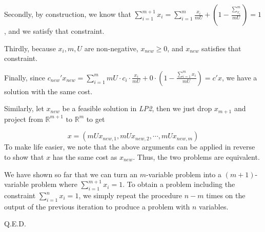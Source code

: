Secondly, by construction, we know that $\sum_{i=1}^{m+1}x_i=\sum_{i=1}^{m}\frac{x_i}{mU}+(1 - \frac{\sum_{x_i}^{m}}{mU})=1$, and we satisfy that constraint.

Thirdly, because $x_i, m, U$ are non-negative, $x_{new}\geq 0$, and $x_{new}$ satisfies that constraint.

Finally, since $c_{new}'x_{new}=\sum_{i=1}^m mU\cdot c_i\cdot \frac{x_i}{mU} + 0\cdot (1 - \frac{\sum_{i=1}^{m}x_i}{mU})=c'x$, we have a solution with the same cost.


Similarly, let $x_{new}$ be a feasible solution in \textit{LP2}, then we just drop $x_{m+1}$ and project from $\mathbb{R}^{m+1} \text{ to } \mathbb{R}^m$ to get

\[ x = (mUx_{new,1}, mUx_{new, 2}, \cdots, mUx_{new, m})\]
To make life easier, we note that the above arguments can be applied in reverse to show that $x$ has the same cost as $x_{new}$. Thus, the two problems are equivalent.

We have shown so far that we can turn an $m$-variable problem into a $(m+1)$-variable problem where $\sum_{i=1}^{m+1}x_i=1$. To obtain a problem including the constraint $\sum_{i=1}^nx_i=1$, we simply repeat the procedure $n-m$ times on the output of the previous iteration to produce a problem with $n$ variables.

Q.E.D.